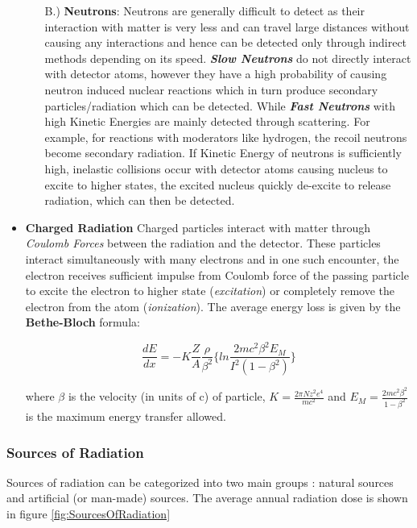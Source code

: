 \documentclass[../../Report.tex]{subfiles}
\begin{document}
\begin{itemize}
\begin{enumerate}
            \item[B.)] \textbf{Neutrons}: Neutrons are generally difficult to detect as their interaction with matter 
            is very less and can travel large distances without causing any interactions and hence can be detected only 
            through indirect methods depending on its speed. \textbf{\textit{Slow Neutrons }} do not directly interact with 
            detector atoms, however they have a high probability of causing neutron induced nuclear reactions which in turn 
            produce secondary particles/radiation which can be detected. While \textbf{\textit{Fast Neutrons} } with high 
            Kinetic Energies are mainly detected through scattering. For example, for reactions with moderators like hydrogen, 
            the recoil neutrons become secondary radiation. If Kinetic Energy of neutrons is sufficiently high, 
            inelastic collisions occur with detector atoms causing nucleus to excite to higher states, the excited nucleus 
            quickly de-excite to release radiation, which can then be detected. 
        \end{enumerate}

        \item \textbf{Charged Radiation} Charged particles interact with matter through \textit{Coulomb Forces} 
        between the radiation and the detector. These particles interact simultaneously with many electrons and in one 
        such encounter, the electron receives sufficient impulse from Coulomb force of the passing particle to excite 
        the electron to higher state (\textit{excitation}) or completely remove the electron from the atom 	
        (\textit{ionization}). The average energy loss is given by the \textbf{Bethe-Bloch}\cite{t1} formula:

        $$\frac{dE}{dx}=-K\frac{Z}{A}\frac{\rho}{\beta^2}\{ln\frac{2mc^2\beta^2E_M}{I^2(1-\beta^2)}\}$$

        where $\beta$ is the velocity (in units of c) of particle, 
        $K=\frac{2\pi Nz^2e^4}{mc^2}$ and $E_M=\frac{2mc^2\beta^2}{1-\beta^2}$ is the maximum energy transfer allowed.
        
    \end{itemize}
    
    \subsubsection*{\large Sources of Radiation}
        Sources of radiation can be categorized into two main groups \cite{u5}: natural sources and artificial (or man-made) sources. 
        The average annual radiation dose is shown in figure \ref{fig:SourcesOfRadiation}
\end{document}
